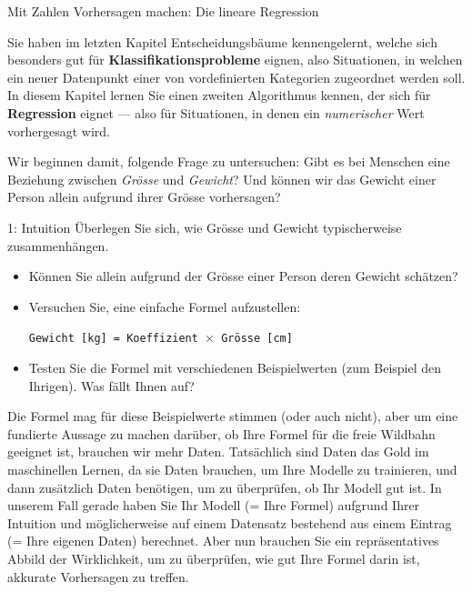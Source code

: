 \begin{lpu}{Mit Zahlen Vorhersagen machen: Die lineare Regression}
\label{sec:regression}

Sie haben im letzten Kapitel Entscheidungsbäume kennengelernt, welche sich besonders gut für \textbf{Klassifikationsprobleme} eignen, also Situationen, in welchen ein neuer Datenpunkt einer von vordefinierten Kategorien zugeordnet werden soll. In diesem Kapitel lernen Sie einen zweiten Algorithmus kennen, der sich für \textbf{Regression} eignet — also für Situationen, in denen ein \textit{numerischer} Wert vorhergesagt wird.

Wir beginnen damit, folgende Frage zu untersuchen: Gibt es bei Menschen eine Beziehung zwischen \emph{Grösse} und \emph{Gewicht}? Und können wir das Gewicht einer Person allein aufgrund ihrer Grösse vorhersagen?

\begin{aufgabe}{1: Intuition}
Überlegen Sie sich, wie Grösse und Gewicht typischerweise zusammenhängen.

\begin{itemize}
  \item Können Sie allein aufgrund der Grösse einer Person deren Gewicht schätzen?
  \item Versuchen Sie, eine einfache Formel aufzustellen:
  
  \medskip
  \texttt{Gewicht [kg] = Koeffizient $\times$ Grösse [cm]}
  
  \item Testen Sie die Formel mit verschiedenen Beispielwerten (zum Beispiel den Ihrigen). Was fällt Ihnen auf?
\end{itemize}
\end{aufgabe}

Die Formel mag für diese Beispielwerte stimmen (oder auch nicht), aber um eine fundierte Aussage zu machen darüber, ob Ihre Formel für die freie Wildbahn geeignet ist, brauchen wir mehr Daten. Tatsächlich sind Daten das Gold im maschinellen Lernen, da sie Daten brauchen, um Ihre Modelle zu trainieren, und dann zusätzlich Daten benötigen, um zu überprüfen, ob Ihr Modell gut ist. In unserem Fall gerade haben Sie Ihr Modell (= Ihre Formel) aufgrund Ihrer Intuition und möglicherweise auf einem Datensatz bestehend aus einem Eintrag (= Ihre eigenen Daten) berechnet. Aber nun brauchen Sie ein repräsentatives Abbild der Wirklichkeit, um zu überprüfen, wie gut Ihre Formel darin ist, akkurate Vorhersagen zu treffen.


\end{lpu}

